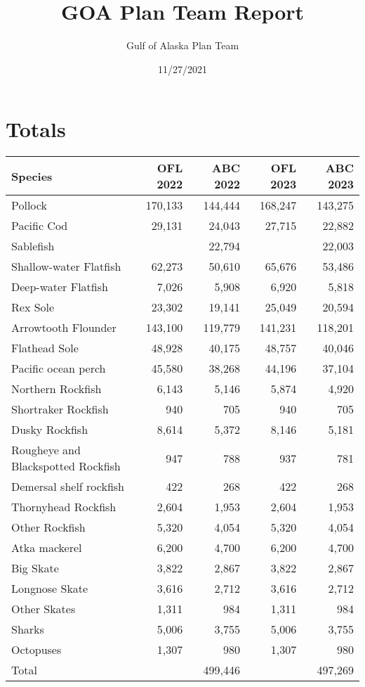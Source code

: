 \documentclass[]{tufte-handout}
\title{GOA Plan Team Report}
\author{Gulf of Alaska Plan Team}
\date{11/27/2021}
\begin{document}
\maketitle




\hypertarget{totals}{%
\section{Totals}\label{totals}}

\begin{table}
\centering
\begin{tabular}[t]{l|r|r|r|r}
\hline
Species & OFL 2022 & ABC 2022 & OFL 2023 & ABC 2023\\
\hline
Pollock & 170,133 & 144,444 & 168,247 & 143,275\\
\hline
Pacific Cod & 29,131 & 24,043 & 27,715 & 22,882\\
\hline
Sablefish &  & 22,794 &  & 22,003\\
\hline
Shallow-water Flatfish & 62,273 & 50,610 & 65,676 & 53,486\\
\hline
Deep-water Flatfish & 7,026 & 5,908 & 6,920 & 5,818\\
\hline
Rex Sole & 23,302 & 19,141 & 25,049 & 20,594\\
\hline
Arrowtooth Flounder & 143,100 & 119,779 & 141,231 & 118,201\\
\hline
Flathead Sole & 48,928 & 40,175 & 48,757 & 40,046\\
\hline
Pacific ocean perch & 45,580 & 38,268 & 44,196 & 37,104\\
\hline
Northern Rockfish & 6,143 & 5,146 & 5,874 & 4,920\\
\hline
Shortraker Rockfish & 940 & 705 & 940 & 705\\
\hline
Dusky Rockfish & 8,614 & 5,372 & 8,146 & 5,181\\
\hline
Rougheye and Blackspotted Rockfish & 947 & 788 & 937 & 781\\
\hline
Demersal shelf rockfish & 422 & 268 & 422 & 268\\
\hline
Thornyhead Rockfish & 2,604 & 1,953 & 2,604 & 1,953\\
\hline
Other Rockfish & 5,320 & 4,054 & 5,320 & 4,054\\
\hline
Atka mackerel & 6,200 & 4,700 & 6,200 & 4,700\\
\hline
Big Skate & 3,822 & 2,867 & 3,822 & 2,867\\
\hline
Longnose Skate & 3,616 & 2,712 & 3,616 & 2,712\\
\hline
Other Skates & 1,311 & 984 & 1,311 & 984\\
\hline
Sharks & 5,006 & 3,755 & 5,006 & 3,755\\
\hline
Octopuses & 1,307 & 980 & 1,307 & 980\\
\hline
Total &  & 499,446 &  & 497,269\\
\hline
\end{tabular}
\end{table}
\end{document}
